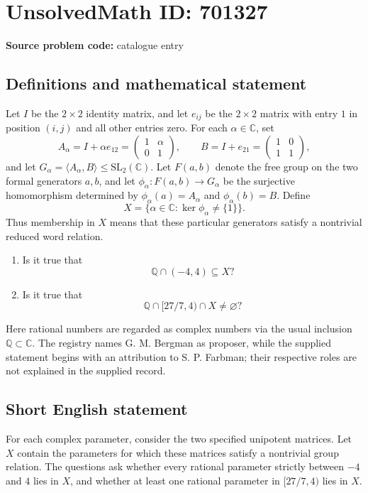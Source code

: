 \documentclass[11pt]{article}
\newcommand{\Q}{\mathbb{Q}}
\newcommand{\C}{\mathbb{C}}
\begin{document}
\section*{UnsolvedMath ID: 701327}
\textbf{Source problem code:} catalogue entry
\subsection{Definitions and mathematical statement}
Let \(I\) be the \(2\times2\) identity matrix, and let \(e_{ij}\) be the \(2\times2\) matrix with entry \(1\) in position \((i,j)\) and all other entries zero. For each \(\alpha\in\C\), set
\[
A_\alpha=I+\alpha e_{12}=\begin{pmatrix}1&\alpha\\0&1\end{pmatrix},\qquad B=I+e_{21}=\begin{pmatrix}1&0\\1&1\end{pmatrix},
\]
and let \(G_\alpha=\langle A_\alpha,B\rangle\leq\mathrm{SL}_2(\C)\). Let \(F(a,b)\) denote the free group on the two formal generators \(a,b\), and let \(\phi_\alpha:F(a,b)\to G_\alpha\) be the surjective homomorphism determined by \(\phi_\alpha(a)=A_\alpha\) and \(\phi_\alpha(b)=B\). Define
\[
X=\{\alpha\in\C:\ker\phi_\alpha\neq\{1\}\}.
\]
Thus membership in \(X\) means that these particular generators satisfy a nontrivial reduced word relation.
\begin{enumerate}
\item[(a)] Is it true that
\[
\Q\cap(-4,4)\subseteq X?
\]
\item[(b)] Is it true that
\[
\Q\cap[27/7,4)\cap X\neq\varnothing?
\]
\end{enumerate}
Here rational numbers are regarded as complex numbers via the usual inclusion \(\Q\subset\C\). The registry names G. M. Bergman as proposer, while the supplied statement begins with an attribution to S. P. Farbman; their respective roles are not explained in the supplied record.
\subsection{Short English statement}
For each complex parameter, consider the two specified unipotent matrices. Let \(X\) contain the parameters for which these matrices satisfy a nontrivial group relation. The questions ask whether every rational parameter strictly between \(-4\) and \(4\) lies in \(X\), and whether at least one rational parameter in \([27/7,4)\) lies in \(X\).
\end{document}
